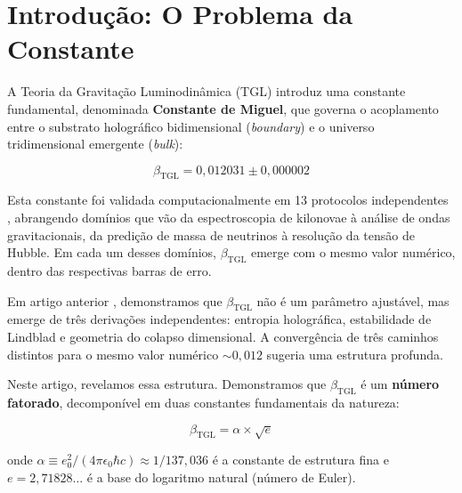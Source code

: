 \documentclass[12pt,a4paper,twoside]{article}
\newcommand{\betatgl}{\beta_{\!\scriptscriptstyle\mathrm{TGL}}}
\newcommand{\boundary}{\textit{boundary}}
\newcommand{\bulk}{\textit{bulk}}
\begin{document}
\tableofcontents
\newpage


\section{Introdução: O Problema da Constante}

A Teoria da Gravitação Luminodinâmica (TGL) \cite{Miguel2026Fronteira, Miguel2026LastString} introduz uma constante fundamental, denominada \textbf{Constante de Miguel}, que governa o acoplamento entre o substrato holográfico bidimensional (\boundary) e o universo tridimensional emergente (\bulk):

\begin{equation}
\betatgl = 0{,}012031 \pm 0{,}000002
\label{eq:betatgl_value}
\end{equation}

Esta constante foi validada computacionalmente em 13 protocolos independentes \cite{Miguel2026GitHub}, abrangendo domínios que vão da espectroscopia de kilonovae à análise de ondas gravitacionais, da predição de massa de neutrinos à resolução da tensão de Hubble. Em cada um desses domínios, $\betatgl$ emerge com o mesmo valor numérico, dentro das respectivas barras de erro.

Em artigo anterior \cite{Miguel2025Alpha2}, demonstramos que $\betatgl$ não é um parâmetro ajustável, mas emerge de três derivações independentes: entropia holográfica, estabilidade de Lindblad e geometria do colapso dimensional. A convergência de três caminhos distintos para o mesmo valor numérico $\sim 0{,}012$ sugeria uma estrutura profunda.

Neste artigo, revelamos essa estrutura. Demonstramos que $\betatgl$ é um \textbf{número fatorado}, decomponível em duas constantes fundamentais da natureza:

\begin{equationbox}[title={A Fatoração}]
\begin{equation}
\boxed{\betatgl = \alpha \times \sqrt{e}}
\label{eq:fatoracao}
\end{equation}
\end{equationbox}

\noindent onde $\alpha \equiv e_0^2 / (4\pi\epsilon_0 \hbar c) \approx 1/137{,}036$ é a constante de estrutura fina e $e = 2{,}71828\ldots$ é a base do logaritmo natural (número de Euler).
\end{document}
